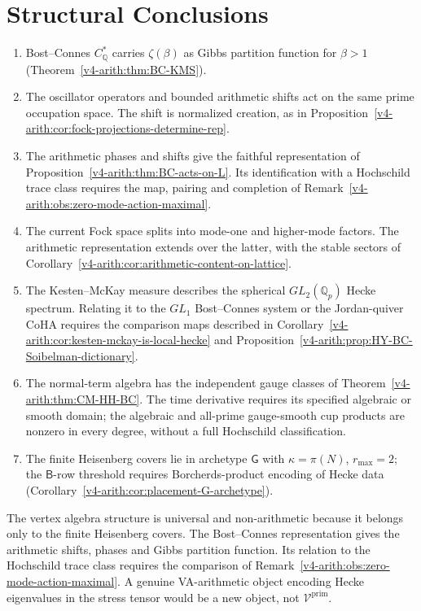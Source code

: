 \section{Structural Conclusions}
\label{v4-arith:cs:summary}

\begin{enumerate}
\item Bost--Connes \(C^{*}_{\mathbb{Q}}\) carries \(\zeta(\beta)\) as
Gibbs partition function for \(\beta>1\)
(Theorem~\ref{v4-arith:thm:BC-KMS}).
\item The oscillator operators and bounded arithmetic shifts act
on the same prime occupation space. The shift is normalized
creation, as in
Proposition~\ref{v4-arith:cor:fock-projections-determine-rep}.
\item The arithmetic phases and shifts give the faithful
representation of Proposition~\ref{v4-arith:thm:BC-acts-on-L}.
Its identification with a Hochschild trace class requires the
map, pairing and completion of
Remark~\ref{v4-arith:obs:zero-mode-action-maximal}.
\item The current Fock space splits into mode-one and higher-mode
factors. The arithmetic representation extends over the latter,
with the stable sectors of
Corollary~\ref{v4-arith:cor:arithmetic-content-on-lattice}.

\item The Kesten--McKay measure describes the spherical
\(GL_2(\mathbb Q_p)\) Hecke spectrum. Relating it to the
\(GL_1\) Bost--Connes system or the Jordan-quiver CoHA requires
the comparison maps described in
Corollary~\ref{v4-arith:cor:kesten-mckay-is-local-hecke} and
Proposition~\ref{v4-arith:prop:HY-BC-Soibelman-dictionary}.
\item The normal-term algebra has the independent gauge classes of
Theorem~\ref{v4-arith:thm:CM-HH-BC}. The time derivative requires
its specified algebraic or smooth domain; the algebraic and all-prime gauge-smooth cup products are nonzero
in every degree, without a full Hochschild classification.
\item The finite Heisenberg covers lie in archetype \(\mathsf{G}\)
with \(\kappa=\pi(N)\), \(r_{\max}=2\); the \(\mathsf{B}\)-row threshold
requires Borcherds-product encoding of Hecke data
(Corollary~\ref{v4-arith:cor:placement-G-archetype}).
\end{enumerate}

The vertex algebra structure is universal and non-arithmetic because
it belongs only to the finite Heisenberg covers. The Bost--Connes representation gives the arithmetic shifts, phases
and Gibbs partition function. Its relation to the Hochschild trace
class requires the comparison of
Remark~\ref{v4-arith:obs:zero-mode-action-maximal}. A genuine VA-arithmetic object encoding Hecke
eigenvalues in the stress tensor would be a new object, not
\(\mathcal{V}^{\mathrm{prim}}\).

